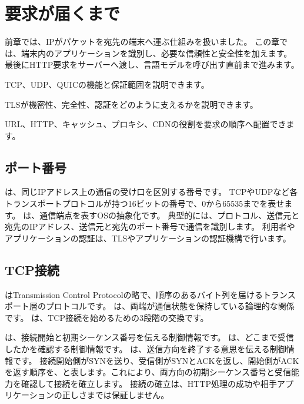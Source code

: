 \chapter{要求が届くまで}
\label{chap:request-delivery}

\begin{chapterabstract}
前章では、IPがパケットを宛先の端末へ運ぶ仕組みを扱いました。
この章では、端末内のアプリケーションを識別し、必要な信頼性と安全性を加えます。
最後にHTTP要求をサーバーへ渡し、言語モデルを呼び出す直前まで進みます。
\end{chapterabstract}

\begin{learninggoals}
  \item TCP、UDP、QUICの機能と保証範囲を説明できます。
  \item TLSが機密性、完全性、認証をどのように支えるかを説明できます。
  \item URL、HTTP、キャッシュ、プロキシ、CDNの役割を要求の順序へ配置できます。
\end{learninggoals}


\section{ポート番号}

は、同じIPアドレス上の通信の受け口を区別する番号です。
TCPやUDPなど各トランスポートプロトコルが持つ16ビットの番号で、0から65535までを表せます。
は、通信端点を表すOSの抽象化です。
典型的には、プロトコル、送信元と宛先のIPアドレス、送信元と宛先のポート番号で通信を識別します。
利用者やアプリケーションの認証は、TLSやアプリケーションの認証機構で行います。

\section{TCP接続}

はTransmission Control Protocolの略で、順序のあるバイト列を届けるトランスポート層のプロトコルです。
は、両端が通信状態を保持している論理的な関係です。
は、TCP接続を始めるための3段階の交換です。

は、接続開始と初期シーケンス番号を伝える制御情報です。
は、どこまで受信したかを確認する制御情報です。
は、送信方向を終了する意思を伝える制御情報です。
接続開始側がSYNを送り、受信側がSYNとACKを返し、開始側がACKを返す順序を、と表します。これにより、両方向の初期シーケンス番号と受信能力を確認して接続を確立します。
接続の確立は、HTTP処理の成功や相手アプリケーションの正しさまでは保証しません。

